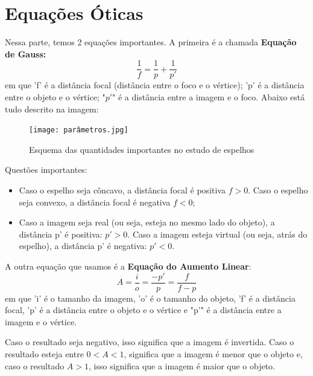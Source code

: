 \documentclass[12pt]{extarticle}
\newcommand{\<}{\langle}
\renewcommand{\>}{\rangle}
\theoremstyle{definition}
\begin{document}
\section{Equações Óticas}
Nessa parte, temos 2 equações importantes. A primeira é a chamada \textbf{Equação de Gauss:}
\begin{equation}
    \frac{1}{f} = \frac{1}{p} + \frac{1}{p'}
\end{equation}
\noindent em que 'f' é a distância focal (distância entre o foco e o vértice); 'p' é a distância entre o objeto e o vértice; "$p'$" é a distância entre a imagem e o foco. Abaixo está tudo descrito na imagem:
\begin{figure}[H]
    \centering
    \texttt{[image: parâmetros.jpg]}
    \caption{Esquema das quantidades importantes no estudo de espelhos}
    \label{fig:parametros}
\end{figure}

Questões importantes:
\begin{itemize}
    \item Caso o espelho seja côncavo, a distância focal é positiva $f>0$. Caso o espelho seja convexo, a distância focal é negativa $f<0$;
    \item Caso a imagem seja real (ou seja, esteja no mesmo lado do objeto), a distância p' é positiva: $p'>0$. Caso a imagem esteja virtual (ou seja, atrás do espelho), a distância p' é negativa: $p'<0$.
\end{itemize}

A outra equação que usamos é a \textbf{Equação do Aumento Linear}:
\begin{equation}
    A = \frac{i}{o} = \frac{-p'}{p} = \frac{f}{f-p}
\end{equation}
\noindent em que 'i' é o tamanho da imagem, 'o' é o tamanho do objeto, 'f' é a distância focal, 'p' é a distância entre o objeto e o vértice e "p'" é a distância entre a imagem e o vértice.

Caso o resultado seja negativo, isso significa que a imagem é invertida. Caso o resultado esteja entre $0<A<1$, significa que a imagem é menor que o objeto e, caso o resultado $A>1$, isso significa que a imagem é maior que o objeto.
\end{document}
